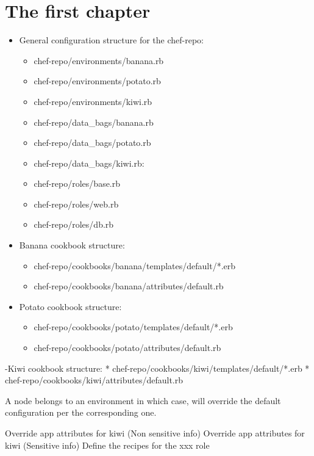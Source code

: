 \chapter{The first chapter}

\label{cha:a_chapter}

\begin{itemize}
\item General configuration structure for the chef-repo:


\begin{itemize}
\item chef-repo/environments/banana.rb
\item chef-repo/environments/potato.rb
\item chef-repo/environments/kiwi.rb
\item chef-repo/data\_bags/banana.rb
\item chef-repo/data\_bags/potato.rb
\item chef-repo/data\_bags/kiwi.rb: 
\item chef-repo/roles/base.rb
\item chef-repo/roles/web.rb
\item chef-repo/roles/db.rb
\end{itemize}
\item Banana cookbook structure:


\begin{itemize}
\item chef-repo/cookbooks/banana/templates/default/*.erb
\item chef-repo/cookbooks/banana/attributes/default.rb
\end{itemize}
\item Potato cookbook structure:


\begin{itemize}
\item chef-repo/cookbooks/potato/templates/default/*.erb
\item chef-repo/cookbooks/potato/attributes/default.rb
\end{itemize}
\end{itemize}

-Kiwi cookbook structure:
    * chef-repo/cookbooks/kiwi/templates/default/*.erb
    * chef-repo/cookbooks/kiwi/attributes/default.rb

A node belongs to an environment in which case, will override the default configuration per the corresponding one.

Override app attributes for kiwi (Non sensitive info)
Override app attributes for kiwi (Sensitive info)
Define the recipes for the xxx role

